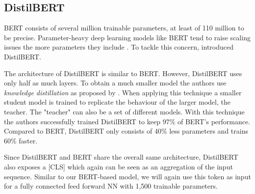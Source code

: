 \subsection{DistilBERT}
\label{chp:approach:sec:models:subsec:distilbert}

\Ac{BERT} consists of several million trainable parameters, at least of 110 million to be precise.
Parameter-heavy deep learning models like \ac{BERT} tend to raise scaling issues the more parameters they include \parencite{Schwartz:2019}.
To tackle this concern, \textcite{Sanh:2019} introduced \acl{DistilBERT}.

The architecture of \ac{DistilBERT} is similar to \ac{BERT}.
However, \ac{DistilBERT} uses only half as much layers.
To obtain a much smaller model the authors use \textit{knowledge distillation} as proposed by \textcites{Bucilua:2006}{Hinton:2015}.
When applying this technique a smaller student model is trained to replicate the behaviour of the larger model, the teacher.
The "teacher" can also be a set of different models.
With this technique the authors successfully trained \ac{DistilBERT} to keep 97\% of \ac{BERT}'s performance.
Compared to \ac{BERT}, \ac{DistilBERT} only consists of 40\% less parameters and trains 60\% faster. \parencite{Sanh:2019}

Since \ac{DistilBERT} and \ac{BERT} share the overall same architecture, \ac{DistilBERT} also exposes a [CLS] which again can be seen as an aggregation of the input sequence.
Similar to our \ac{BERT}-based model, we will again use this token as input for a fully connected feed forward \ac{NN} with 1,500 trainable parameters.
